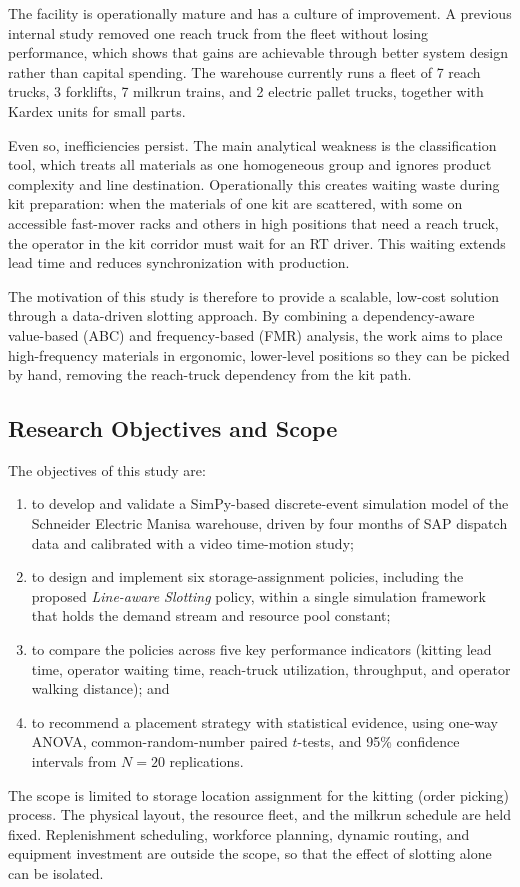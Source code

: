 \documentclass[conference]{IEEEtran}
\newcommand{\policy}[1]{\textit{#1}}
\begin{document}
The facility is operationally mature and has a culture of improvement. A
previous internal study removed one reach truck from the fleet without losing
performance, which shows that gains are achievable through better system
design rather than capital spending. The warehouse currently runs a fleet of
7 reach trucks, 3 forklifts, 7 milkrun trains, and 2 electric pallet trucks,
together with Kardex units for small parts.

Even so, inefficiencies persist. The main analytical weakness is the
classification tool, which treats all materials as one homogeneous group and
ignores product complexity and line destination. Operationally this creates
waiting waste during kit preparation: when the materials of one kit are
scattered, with some on accessible fast-mover racks and others in high
positions that need a reach truck, the operator in the kit corridor must wait
for an RT driver. This waiting extends lead time and reduces synchronization
with production.

The motivation of this study is therefore to provide a scalable, low-cost
solution through a data-driven slotting approach. By combining a
dependency-aware value-based (ABC) and frequency-based (FMR) analysis, the
work aims to place high-frequency materials in ergonomic, lower-level
positions so they can be picked by hand, removing the reach-truck dependency
from the kit path.

\subsection{Research Objectives and Scope}
The objectives of this study are:
\begin{enumerate}
\item to develop and validate a SimPy-based discrete-event simulation model of
the Schneider Electric Manisa warehouse, driven by four months of SAP dispatch
data and calibrated with a video time-motion study;
\item to design and implement six storage-assignment policies, including the
proposed \policy{Line-aware Slotting} policy, within a single simulation
framework that holds the demand stream and resource pool constant;
\item to compare the policies across five key performance indicators (kitting
lead time, operator waiting time, reach-truck utilization, throughput, and
operator walking distance); and
\item to recommend a placement strategy with statistical evidence, using
one-way ANOVA, common-random-number paired $t$-tests, and 95\% confidence
intervals from $N=20$ replications.
\end{enumerate}
The scope is limited to storage location assignment for the kitting (order
picking) process. The physical layout, the resource fleet, and the milkrun
schedule are held fixed. Replenishment scheduling, workforce planning, dynamic
routing, and equipment investment are outside the scope, so that the effect of
slotting alone can be isolated.
\end{document}

